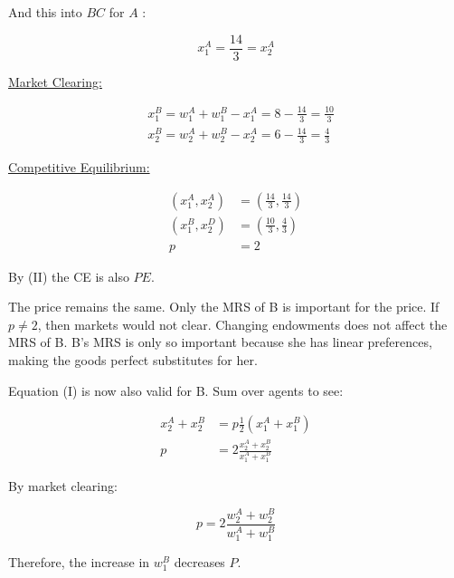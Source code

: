{\begin{enumerate}[label=(\alph*)]
{And this into $B C$ for $A$ :

$$
x_{1}^{A}=\frac{14}{3}=x_{2}^{A}
$$

\underline{Market Clearing:}

$$
\begin{aligned}
& x_{1}^{B}=w_{1}^{A}+w_{1}^{B}-x_{1}^{A}=8-\frac{14}{3}=\frac{10}{3} \\
& x_{2}^{B}=w_{2}^{A}+w_{2}^{B}-x_{2}^{A}=6-\frac{14}{3}=\frac{4}{3}
\end{aligned}
$$

\underline{Competitive Equilibrium:}

$$
\begin{aligned}
\left(x_{1}^{A}, x_{2}^{A}\right) & =\left(\frac{14}{3}, \frac{14}{3}\right) \\
\left(x_{1}^{B}, x_{2}^{D}\right) & =\left(\frac{10}{3}, \frac{4}{3}\right) \\
p & =2
\end{aligned}
$$

By (II) the CE is also $P E$.
}
{\item 
The price remains the same. Only the MRS of B is important for the price. If $p \neq 2$, then markets would not clear. Changing endowments does not affect the MRS of B. B's MRS is only so important because she has linear preferences, making the goods perfect substitutes for her.
}
{\item 
Equation (I) is now also valid for B. Sum over agents to see:

$$
\begin{aligned}
x_{2}^{A}+x_{2}^{B} & =p \frac{1}{2}\left(x_{1}^{A}+x_{1}^{B}\right) \\
p & =2 \frac{x_{2}^{A}+x_{2}^{B}}{x_{1}^{A}+x_{1}^{B}}
\end{aligned}
$$

By market clearing:

$$
p=2 \frac{w_{2}^{A}+w_{2}^{B}}{w_{1}^{A}+w_{1}^{B}}
$$

Therefore, the increase in $w_{1}^{B}$ decreases $P$.
}
\end{enumerate}
}
